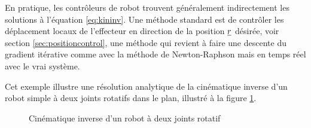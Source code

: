 En pratique, les contrôleurs de robot trouvent généralement indirectement les solutions à l'équation \eqref{eq:kininv}. Une méthode standard est de contrôler les déplacement locaux de l'effecteur en direction de la position $\underline{r}$ désirée, voir section \ref{sec:positioncontrol}, une méthode qui revient à faire une descente du gradient itérative comme avec la méthode de Newton-Raphson mais en temps réel avec le vrai système.

\begin{example}

Cet exemple illustre une résolution analytique de la cinématique inverse d'un robot simple à deux joints rotatifs dans le plan, illustré à la figure \ref{fig:invkin}.

\begin{figure}[H]
        \centering
				\hspace{10pt}
        \caption{Cinématique inverse d'un robot à deux joints rotatif }
				\label{fig:invkin}
\end{figure}


\end{example}
